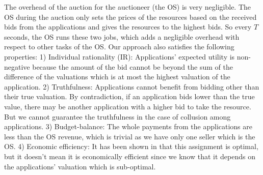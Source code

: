 \indent The overhead of the auction for the auctioneer (the OS) is very negligible. The OS during the auction only sets the prices of the resources based on the received bids from the applications and gives the resources to the highest bids. So every $T$ seconds, the OS runs these two jobs, which adds a negligible overhead with respect to other tasks of the OS. Our approach also satisfies the following properties:
1) Individual rationality (IR): Applications' expected utility is non-negative because the amount of the bid cannot be beyond the sum of the difference of the valuations which is at most the highest valuation of the application.
2) Truthfulness: Applications cannot benefit from bidding other than their true valuation. By contradiction, if an application bids lower than the true value, there may be another application with a higher bid to take the resource. But we cannot guarantee the truthfulness in the case of collusion among applications.
3) Budget-balance: The whole payments from the applications are less than the OS revenue, which is trivial as we have only one seller which is the OS.
4) Economic efficiency: It has been shown in \cite{bertsekas1998network} that this assignment is optimal, but it doesn't mean it is economically efficient since we know that it depends on the applications' valuation which is sub-optimal.
